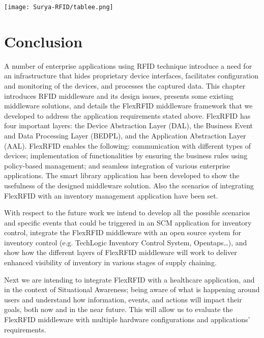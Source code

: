 \documentclass[a4paper,12pt]{article}
\begin{document}
\begin{multicols}{2}
\pagebreak

\texttt{[image: Surya-RFID/tablee.png]}

\pagebreak







\section{Conclusion}
A number of enterprise applications using RFID technique introduce a need for an infrastructure that hides proprietary device interfaces, facilitates configuration and monitoring of the devices, and processes the captured data. This chapter introduces RFID middleware and its design issues, presents some existing middleware solutions, and details the FlexRFID middleware framework that we developed to address the application requirements stated above. FlexRFID has four important layers: the Device Abstraction Layer (DAL), the Business Event and Data Processing Layer (BEDPL), and the Application Abstraction Layer (AAL). FlexRFID enables the following: communication with different types of devices; implementation of functionalities by ensuring the business rules using policy-based management; and seamless integration of various enterprise applications. The smart library application has been developed to show the usefulness of the designed middleware solution. Also the scenarios of integrating FlexRFID with an inventory management application have been set.

With respect to the future work we intend to develop all the possible scenarios and specific events that could be triggered in an SCM application for inventory control, integrate the FlexRFID middleware with an open source system for inventory control (e.g. TechLogic Inventory Control System, Opentaps…), and show how the different layers of FlexRFID middleware will work to deliver enhanced visibility of inventory in various stages of supply chaining.

Next we are intending to integrate FlexRFID with a healthcare application, and in the context of Situational Awareness; being aware of what is happening around users and understand how information, events, and actions will impact their goals, both now and in the near future. This will allow us to evaluate the FlexRFID middleware with multiple hardware configurations and applications’ requirements.


\end{multicols}
\end{document}
